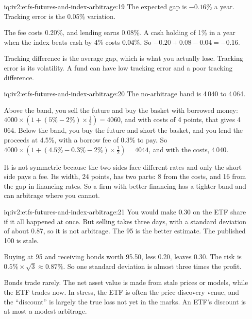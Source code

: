\begin{solution}{iq:iv2:etfs-futures-and-index-arbitrage:19}
The expected gap is $-0.16\%$ a year. Tracking error is the 0.05\% variation.

The fee costs 0.20\%, and lending earns 0.08\%. A cash holding of 1\% in a year when the index beats cash by 4\% costs 0.04\%. So $-0.20 + 0.08 - 0.04 = -0.16$.

Tracking difference is the average gap, which is what you actually lose. Tracking error is its volatility. A fund can have low tracking error and a poor tracking difference.

\end{solution}

\begin{solution}{iq:iv2:etfs-futures-and-index-arbitrage:20}
The no-arbitrage band is 4\,040 to 4\,064.

Above the band, you sell the future and buy the basket with borrowed money: $4000 \times (1 + (5\% - 2\%) \times \tfrac12) = 4060$, and with costs of 4 points, that gives 4\,064. Below the band, you buy the future and short the basket, and you lend the proceeds at 4.5\%, with a borrow fee of 0.3\% to pay. So $4000 \times (1 + (4.5\% - 0.3\% - 2\%) \times \tfrac12) = 4044$, and with the costs, 4\,040.

It is not symmetric because the two sides face different rates and only the short side pays a fee. Its width, 24 points, has two parts: 8 from the costs, and 16 from the gap in financing rates. So a firm with better financing has a tighter band and can arbitrage where you cannot.

\end{solution}

\begin{solution}{iq:iv2:etfs-futures-and-index-arbitrage:21}
You would make 0.30 on the ETF share if it all happened at once. But selling takes three days, with a standard deviation of about 0.87, so it is not arbitrage. The 95 is the better estimate. The published 100 is stale.

Buying at 95 and receiving bonds worth 95.50, less 0.20, leaves 0.30. The risk is $0.5\% \times \sqrt 3 \approx 0.87\%$. So one standard deviation is almost three times the profit.

Bonds trade rarely. The net asset value is made from stale prices or models, while the ETF trades now. In stress, the ETF is often the price discovery venue, and the ``discount'' is largely the true loss not yet in the marks. An ETF's discount is at most a modest arbitrage.

\end{solution}

